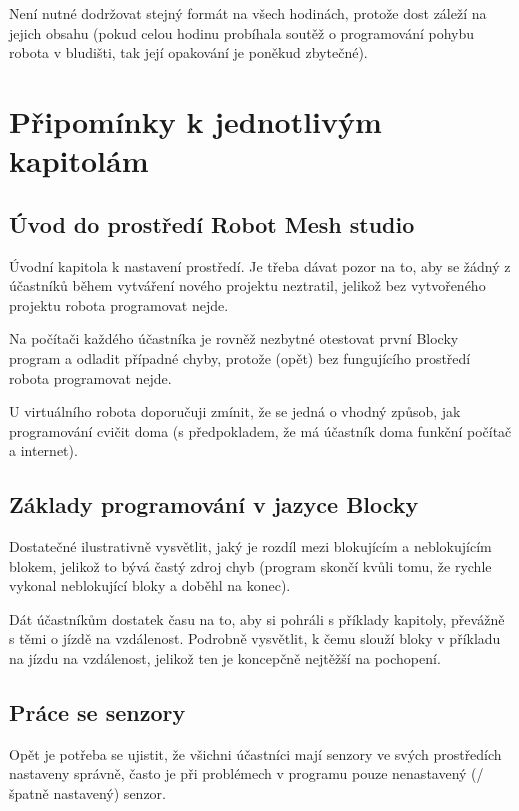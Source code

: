 Není nutné dodržovat stejný formát na všech hodinách, protože dost záleží na jejich obsahu (pokud celou hodinu probíhala soutěž o programování pohybu robota v bludišti, tak její opakování je poněkud zbytečné).

\cleardoublepage

\section{Připomínky k jednotlivým kapitolám}

\setcounter{secnumdepth}{3}

\subsection{Úvod do prostředí Robot Mesh studio}
Úvodní kapitola k nastavení prostředí. Je třeba dávat pozor na to, aby se žádný z účastníků během vytváření nového projektu neztratil, jelikož bez vytvořeného projektu robota programovat nejde.

Na počítači každého účastníka je rovněž nezbytné otestovat první Blocky program a odladit případné chyby, protože (opět) bez fungujícího prostředí robota programovat nejde.

U virtuálního robota doporučuji zmínit, že se jedná o vhodný způsob, jak programování cvičit doma (s předpokladem, že má účastník doma funkční počítač a internet).

\subsection{Základy programování v jazyce Blocky}
Dostatečné ilustrativně vysvětlit, jaký je rozdíl mezi blokujícím a neblokujícím blokem, jelikož to bývá častý zdroj chyb (program skončí kvůli tomu, že rychle vykonal neblokující bloky a doběhl na konec).

Dát účastníkům dostatek času na to, aby si pohráli s příklady kapitoly, převážně s těmi o jízdě na vzdálenost. Podrobně vysvětlit, k čemu slouží bloky v příkladu na jízdu na vzdálenost, jelikož ten je koncepčně nejtěžší na pochopení.

\subsection{Práce se senzory}
Opět je potřeba se ujistit, že všichni účastníci mají senzory ve svých prostředích nastaveny správně, často je při problémech v programu pouze nenastavený (/špatně nastavený) senzor.

